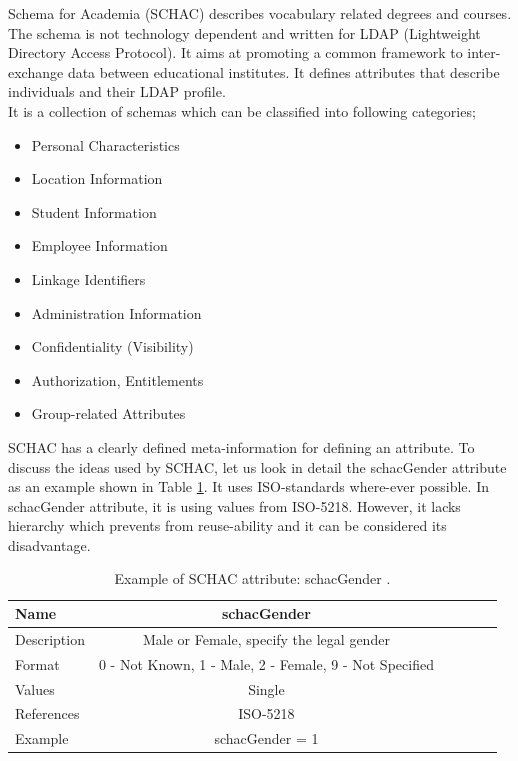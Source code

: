 \documentclass[12pt,a4paper,oneside]{book}
\begin{document}
    Schema for Academia (SCHAC) describes vocabulary related degrees and courses. The schema is not technology dependent and written for LDAP (Lightweight Directory Access Protocol). It aims at promoting a common framework to inter-exchange data between educational institutes. It defines attributes that describe individuals and their LDAP profile. \\
    
	It is a collection of schemas which can be classified into following categories;
\begin{itemize}
\item
Personal Characteristics
\item
Location Information
\item
Student Information
\item
Employee Information
\item
Linkage Identifiers
\item
Administration Information
\item
Confidentiality (Visibility)
\item
Authorization, Entitlements
\item
Group-related Attributes
\end{itemize}

	SCHAC has a clearly defined meta-information for defining an attribute. To discuss the ideas  used by SCHAC, let us look in detail the schacGender attribute as an example shown in Table \ref{tab:schacGender}. It uses ISO-standards where-ever possible. In schacGender attribute, it is using values from ISO-5218. However, it lacks hierarchy which prevents from reuse-ability and it can be considered its disadvantage. \\
	
\begin{table}[!tbh]
\caption{Example of SCHAC attribute: schacGender \cite{SCHAC 1.5.0}.}
\label{tab:schacGender}
\centering
\begin{tabular}[width=\columnwidth]{|p{1.3in}|c|c|c|c|c|}
\hline
Name               	& schacGender \\
\hline
Description 	    & Male or Female, specify the legal gender	\\
Format	    		& 0 - Not Known, 1 - Male, 2 - Female, 9 - Not Specified \\
Values				& Single \\
References	        & ISO-5218	\\
Example	            & schacGender = 1	\\
\hline
\end{tabular}
\end{table}
\end{document}
